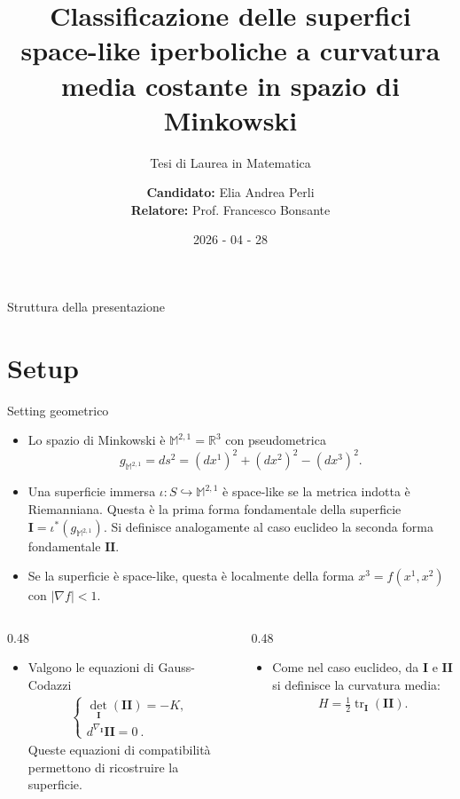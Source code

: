 \documentclass[aspectratio=169,11pt]{beamer}
\title{Classificazione delle superfici space-like iperboliche a curvatura media costante in spazio di Minkowski}
\subtitle{Tesi di Laurea in Matematica}
\author{\centering \textbf{Candidato:} Elia Andrea Perli\\
		\textbf{Relatore:} Prof. Francesco Bonsante}
\institute{Università degli Studi di Pavia}
\date{  2026 - 04 - 28}
\newcommand{\tr}{\operatorname{tr}}
\newcommand{\R}{\mathbb{R}}
\newcommand{\M}{\mathbb{M}^{2,1}}
\newcommand{\I}{\mathbf{I}}
\newcommand{\II}{\mathbf{II}}
\begin{document}
\begin{frame}
  \titlepage
\end{frame}

\begin{frame}{Struttura della presentazione}
\tableofcontents[hideallsubsections]
\end{frame}

\section{Setup}


\begin{frame}{Setting geometrico}
	\begin{itemize}
		\item Lo spazio di Minkowski è $\M=\R^3$ con pseudometrica
			\[
				g_{\M} = ds^2 = (dx^1)^2+(dx^2)^2-(dx^3)^2.
			\]
		\item Una superficie immersa $ \iota:S\hookrightarrow \M$ è
			\alert{space-like} se la metrica indotta è Riemanniana.
			Questa è la prima forma fondamentale della superficie
			$\I = \iota^*(g_{\M})$. Si definisce analogamente al caso euclideo la seconda
			forma fondamentale $\II$.
		\item Se la superficie è space-like, questa è localmente della forma
			$x^3=f(x^1,x^2)$ con $|\nabla f|<1$.
	\end{itemize}
	\vspace{0mm}
	\begin{columns}[T,onlytextwidth]
		\begin{column}{0.48\textwidth}
			\begin{itemize}
				\item Valgono le equazioni di Gauss-Codazzi
					\begin{align*}
						\begin{cases}
							\det_{\I}(\II)=-K,\\
							d^{\nabla_\I}\II=0\ .
						\end{cases}
					\end{align*}
					Queste equazioni di compatibilità permettono di
					ricostruire la superficie.
			\end{itemize}
		\end{column}

		\begin{column}{0.48\textwidth}
			\begin{itemize}
				\item Come nel caso euclideo, da $\I$ e $\II$ si definisce
					la curvatura media:
					\begin{align*}
						H=\frac{1}{2}\tr_{\I}(\II).
					\end{align*}
			\end{itemize}
		\end{column}
	\end{columns}
\end{frame}
\end{document}
